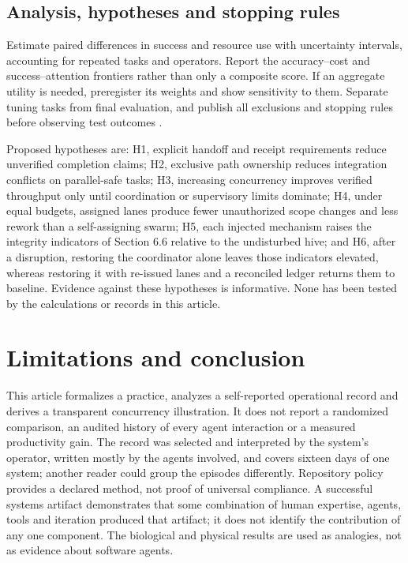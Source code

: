 \documentclass[11pt]{article}
\begin{document}
\subsection{Analysis, hypotheses and stopping rules}

Estimate paired differences in success and resource use with uncertainty intervals, accounting for repeated tasks and operators. Report the accuracy--cost and success--attention frontiers rather than only a composite score. If an aggregate utility is needed, preregister its weights and show sensitivity to them. Separate tuning tasks from final evaluation, and publish all exclusions and stopping rules before observing test outcomes \cite{kapoor}.

Proposed hypotheses are: H1, explicit handoff and receipt requirements reduce unverified completion claims; H2, exclusive path ownership reduces integration conflicts on parallel-safe tasks; H3, increasing concurrency improves verified throughput only until coordination or supervisory limits dominate; H4, under equal budgets, assigned lanes produce fewer unauthorized scope changes and less rework than a self-assigning swarm; H5, each injected mechanism raises the integrity indicators of Section 6.6 relative to the undisturbed hive; and H6, after a disruption, restoring the coordinator alone leaves those indicators elevated, whereas restoring it with re-issued lanes and a reconciled ledger returns them to baseline. Evidence against these hypotheses is informative. None has been tested by the calculations or records in this article.

\section{Limitations and conclusion}

This article formalizes a practice, analyzes a self-reported operational record and derives a transparent concurrency illustration. It does not report a randomized comparison, an audited history of every agent interaction or a measured productivity gain. The record was selected and interpreted by the system's operator, written mostly by the agents involved, and covers sixteen days of one system; another reader could group the episodes differently. Repository policy provides a declared method, not proof of universal compliance. A successful systems artifact demonstrates that some combination of human expertise, agents, tools and iteration produced that artifact; it does not identify the contribution of any one component. The biological and physical results are used as analogies, not as evidence about software agents.
\end{document}
